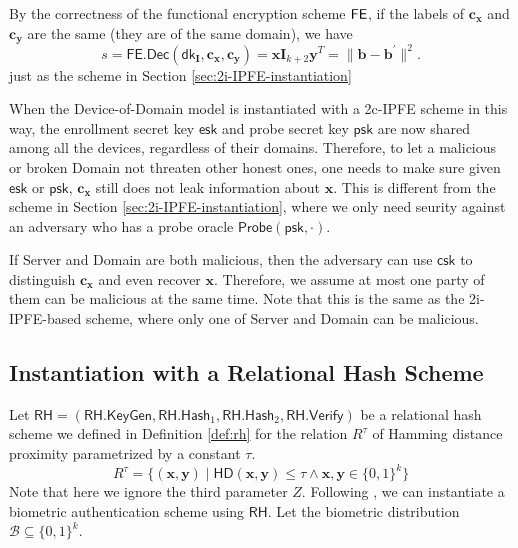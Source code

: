 By the correctness of the functional encryption scheme $\sf FE$, if the labels of $\mathbf{c_x}$ and $\mathbf{c_y}$ are the same (they are of the same domain), we have
\[
	s = \textsf{FE.Dec}(\textsf{dk}_{\mathbf{I}}, \mathbf{c_x}, \mathbf{c_y}) =  \mathbf{x} \mathbf{I}_{k+2} \mathbf{y}^T = \| \mathbf{b} - \mathbf{b}^\prime \|^2.
\]
just as the scheme in Section \ref{sec:2i-IPFE-instantiation}

When the Device-of-Domain model is instantiated with a 2c-IPFE scheme in this way, the enrollment secret key $\textsf{esk}$ and probe secret key $\textsf{psk}$ are now shared among all the devices, regardless of their domains. Therefore, to let a malicious or broken \textsf{Domain} not threaten other honest ones, one needs to make sure given $\textsf{esk}$ or $\textsf{psk}$, $\mathbf{c_x}$ still does not leak information about $\mathbf{x}$. This is different from the scheme in Section \ref{sec:2i-IPFE-instantiation}, where we only need seurity against an adversary who has a probe oracle $\textsf{Probe}(\textsf{psk}, \cdot)$.

If \textsf{Server} and \textsf{Domain} are both malicious, then the adversary can use $\textsf{csk}$ to distinguish $\mathbf{c_x}$ and even recover $\mathbf{x}$. Therefore, we assume at most one party of them can be malicious at the same time. Note that this is the same as the 2i-IPFE-based scheme, where only one of \textsf{Server} and \textsf{Domain} can be malicious.

\fi


\subsection{Instantiation with a Relational Hash Scheme}
\label{sec:rh-instantiation}

Let $\textsf{RH} = (\textsf{RH.KeyGen}, \textsf{RH.Hash}_1, \textsf{RH.Hash}_2, \textsf{RH.Verify})$ be a relational hash scheme we defined in Definition \ref{def:rh} for the relation $R^\tau$ of Hamming distance proximity parametrized by a constant $\tau$.
\[
	R^\tau = \{ (\mathbf{x}, \mathbf{y}) \mid \textsf{HD}(\mathbf{x}, \mathbf{y}) \leq \tau \wedge \mathbf{x}, \mathbf{y} \in \{0,1\}^k \}
\]
Note that here we ignore the third parameter $Z$.
Following \cite{cryptoeprint:2014/394}, we can instantiate a biometric authentication scheme using $\textsf{RH}$.  Let the biometric distribution $\mathcal{B} \subseteq \{0,1\}^k$.

